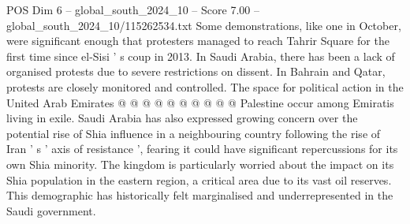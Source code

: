 \begin{textsample}{POS Dim 6 – global\_south\_2024\_10 – Score 7.00 – global\_south\_2024\_10/115262534.txt}
Some demonstrations, like one in October, were significant enough that protesters managed to reach Tahrir Square for the first time since el-Sisi ' s coup in 2013.
In Saudi Arabia, there has been a lack of organised protests due to severe restrictions on dissent.
In Bahrain and Qatar, protests are closely monitored and controlled.
The space for political action in the United Arab Emirates @ @ @ @ @ @ @ @ @ @ Palestine occur among Emiratis living in exile.
Saudi Arabia has also expressed growing concern over the potential rise of Shia influence in a neighbouring country following the rise of Iran ' s ' axis of resistance ', fearing it could have significant repercussions for its own Shia minority.
The kingdom is particularly worried about the impact on its Shia population in the eastern region, a critical area due to its vast oil reserves.
This demographic has historically felt marginalised and underrepresented in the Saudi government.

\end{textsample}
